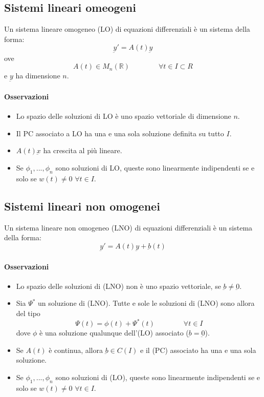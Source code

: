 \documentclass[a4paper,12pt]{article}
\begin{document}
\subsection{Sistemi lineari omeogeni}
Un sistema lineare omogeneo (LO) di equazioni differenziali è un sistema della forma:
$$\underbar{y}' = A(t)\underbar{y}$$
ove $$A(t)\in M_n(\mathbb{R})\qquad \qquad \forall t\in I\subset R$$ e $\underbar{y}$ ha dimensione $n$.
\paragraph{Osservazioni}
\begin{itemize}
 \item Lo spazio delle soluzioni di LO è uno spazio vettoriale di dimensione $n$.
 \item Il PC associato a LO ha una e una sola soluzione definita su tutto $I$.
 \item $A(t)\underbar{x}$ ha crescita al più lineare.
 \item Se $\phi_1,...,\phi_n$ sono soluzioni di LO, queste sono linearmente indipendenti se e solo se $w(t)\neq0$ $\forall t \in I$.
\end{itemize}

\subsection{Sistemi lineari non omogenei}
Un sistema lineare non omogeneo (LNO) di equazioni differenziali è un sistema della forma:
$$\underbar{y}' = A(t)\underbar{y} + \underbar{b}(t)$$
\paragraph{Osservazioni}
\begin{itemize}
 \item Lo spazio delle soluzioni di (LNO) non è uno spazio vettoriale, se $\underbar{b}\neq\underbar{0}$.
 \item Sia $\Psi^*$ un soluzione di (LNO). Tutte e sole le soluzioni di (LNO) sono allora del tipo
       $$ \Psi(t) = \phi(t) + \Psi^*(t)\qquad \qquad \forall t \in I$$
       dove $\phi$ è una soluzione qualunque dell'(LO) associato ($\underbar{b}=\underbar{0}$).
 \item Se $A(t)$ è continua, allora $\underbar{b}\in C(I)$ e il (PC) associato ha una e una sola soluzione.
 \item Se $\phi_1,...,\phi_n$ sono soluzioni di (LO), queste sono linearmente indipendenti se e solo se $w(t)\neq0$ $\forall t \in I$.
\end{itemize}
\end{document}
